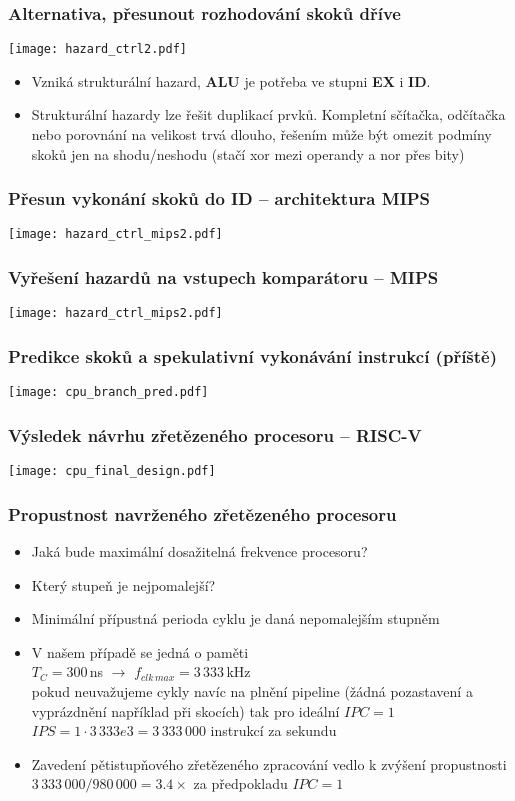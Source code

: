 \documentclass{beamer}
\begin{document}
\begin{frame}
\frametitle{Alternativa, přesunout rozhodování skoků dříve}
\texttt{[image: hazard\_ctrl2.pdf]}

\begin{itemize}
 \item Vzniká strukturální hazard, \textbf{ALU} je potřeba ve stupni \textbf{EX} i \textbf{ID}.
 \item Strukturální hazardy lze řešit duplikací prvků. Kompletní sčítačka, odčítačka nebo porovnání
       na velikost trvá dlouho, řešením může být omezit podmíny skoků jen na shodu/neshodu (stačí xor
       mezi operandy a nor přes bity)
\end{itemize}

\end{frame}

\begin{frame}
\frametitle{Přesun vykonání skoků do ID -- architektura MIPS}
\texttt{[image: hazard\_ctrl\_mips2.pdf]}
\end{frame}

\begin{frame}
\frametitle{Vyřešení hazardů na vstupech komparátoru -- MIPS}
\texttt{[image: hazard\_ctrl\_mips2.pdf]}
\end{frame}

\begin{frame}
\frametitle{Predikce skoků a spekulativní vykonávání instrukcí (příště)}
\texttt{[image: cpu\_branch\_pred.pdf]}
\end{frame}

\begin{frame}
\frametitle{Výsledek návrhu zřetězeného procesoru -- RISC-V}
\texttt{[image: cpu\_final\_design.pdf]}
\end{frame}

\begin{frame}
\frametitle{Propustnost navrženého zřetězeného procesoru}

\begin{itemize}
 \item Jaká bude maximální dosažitelná frekvence procesoru?
 \item Který stupeň je nejpomalejší?
 \item Minimální přípustná perioda cyklu je daná nepomalejším stupněm
 \item V našem případě se jedná o paměti \\
       $T_C = 300$\,ns $\rightarrow$ $f_{clk\,max} = 3\,333$\,kHz \\
       pokud neuvažujeme cykly navíc na plnění pipeline (žádná pozastavení
       a vyprázdnění například při skocích) tak pro ideální $IPC = 1$ \\
       $IPS = 1 \cdot 3\,333e3 = 3\,333\,000$ instrukcí za sekundu
 \item Zavedení pětistupňového zřetězeného zpracování vedlo k zvýšení
       propustnosti $3\,333\,000 / 980\,000 = 3.4 \times$ za předpokladu $IPC = 1$
\end{itemize}

\end{frame}
\end{document}

